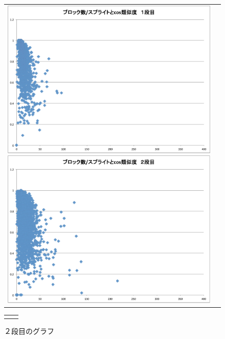 \documentclass[a4paper,10pt,onecolumn,oneside,openany]{jsbook}
\begin{document}
\begin{figure}[h]
 \begin{tabular}{cc}
 	\begin{minipage}[t]{0.45\hsize}
	 \centering
	 \includegraphics[keepaspectratio, scale = 0.25]{block_per_splite_1.pdf}
	 \caption{１段目のグラフ}
	 \label{first_splite}
	\end{minipage}
        \begin{minipage}[t]{0.45\hsize}
	 \centering
	 \includegraphics[keepaspectratio, scale = 0.25]{block_per_splite_2.pdf}
	 \caption{２段目のグラフ}
	 \label{second_splite}
	\end{minipage}
 \end{tabular}
  \begin{tabular}{cc}
 	\begin{minipage}[t]{0.45\hsize}

\end{minipage}
\end{tabular}
\end{figure}
\end{document}
